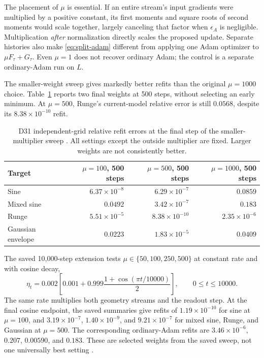 \documentclass[11pt]{article}
\begin{document}
The placement of $\mu$ is essential. If an entire stream's input gradients were multiplied by a positive constant, its first moments and square roots of second moments would scale together, largely canceling that factor when $\epsilon_A$ is negligible. Multiplication \emph{after} normalization directly scales the proposed update. Separate histories also make \eqref{eq:split-adam} different from applying one Adam optimizer to $\mu F_\tau+G_\tau$. Even $\mu=1$ does not recover ordinary Adam; the control is a separate ordinary-Adam run on $L$.

The smaller-weight sweep gives markedly better refits than the original $\mu=1000$ choice. Table~\ref{tab:D31} reports two final weights at 500 steps, without selecting an early minimum. At $\mu=500$, Runge's current-model relative error is still $0.0568$, despite its $8.38\times10^{-10}$ refit.

\begin{table}[htbp]
\centering
\small
\begin{tabular}{@{}lrrr@{}}
\toprule
Target & $\mu=100$, 500 steps & $\mu=500$, 500 steps & $\mu=1000$, 500 steps\\
\midrule
Sine & $6.37\times10^{-8}$ & $6.29\times10^{-7}$ & $0.0859$\\
Mixed sine & $0.0492$ & $3.42\times10^{-7}$ & $0.183$\\
Runge & $5.51\times10^{-5}$ & $8.38\times10^{-10}$ & $2.35\times10^{-6}$\\
Gaussian envelope & $0.0223$ & $1.83\times10^{-5}$ & $0.0409$\\
\bottomrule
\end{tabular}
\caption{D31 independent-grid relative refit errors at the final step of the smaller-multiplier sweep \cite{D31}. All settings except the outside multiplier are fixed. Larger weights are not consistently better.}
\label{tab:D31}
\end{table}

The saved 10,000-step extension tests $\mu\in\{50,100,250,500\}$ at constant rate and with cosine decay,
\begin{equation}
 \eta_t=0.002\left[0.001+0.999\frac{1+\cos(\pi t/10000)}2\right],
 \qquad 0\leq t\leq10000.
\end{equation}
The same rate multiplies both geometry streams and the readout step. At the final cosine endpoint, the saved summaries give refits of $1.19\times10^{-10}$ for sine at $\mu=100$, and $3.19\times10^{-7}$, $1.40\times10^{-9}$, and $9.21\times10^{-7}$ for mixed sine, Runge, and Gaussian at $\mu=500$. The corresponding ordinary-Adam refits are $3.46\times10^{-6}$, $0.207$, $0.00590$, and $0.183$. These are selected weights from the saved sweep, not one universally best setting \cite{D31long}.
\end{document}
